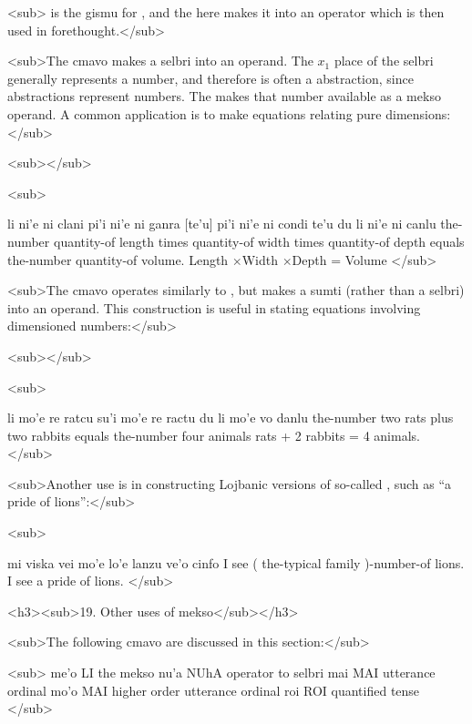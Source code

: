 <sub> is the gismu for ,
    and the  here makes it into an operator which is then
    used in forethought.</sub>

<sub>The cmavo  makes a selbri into an operand. The
    $x_1$ place of the selbri generally represents a number, and
    therefore is often a  abstraction, since 
    abstractions represent numbers. The  makes that number
    available as a mekso operand. A common application is to make
    equations relating pure dimensions:</sub>

<sub></sub>

<sub>
\begin{example}
li ni'e ni clani  pi'i\n
\T	ni'e ni ganra [te'u] pi'i\n
\T	ni'e ni condi te'u\n
\T	du li ni'e ni canlu\n
the-number quantity-of length times\n
\T	quantity-of width times\n
\T	quantity-of depth\n
\T	equals the-number quantity-of volume.\n
Length $\times$Width $\times$Depth = Volume
</sub>
\end{example}

<sub>The cmavo  operates similarly to , but
    makes a sumti (rather than a selbri) into an operand. This
    construction is useful in stating equations involving
    dimensioned numbers:</sub>

<sub></sub>

<sub>
\begin{example}
li mo'e re ratcu su'i mo'e re ractu\n
\T	du li mo'e vo danlu\n
the-number two rats plus two rabbits\n
\T	equals the-number four animals rats + 2 rabbits = 4 animals.
</sub>
\end{example}

<sub>Another use is in constructing Lojbanic versions of
    so-called , such as ``a pride of
    lions'':</sub>

<sub>
\begin{example}
mi viska vei mo'e lo'e lanzu ve'o cinfo\n
I see ( the-typical family )-number-of lions.\n
I see a pride of lions.
</sub>
\end{example}

<h3><sub>19. Other uses of mekso</sub></h3>

<sub>The following cmavo are discussed in this
    section:</sub>

<sub>   me'o    LI  the mekso
    nu'a    NUhA    operator to selbri
    mai MAI utterance ordinal
    mo'o    MAI higher order utterance ordinal
    roi ROI quantified tense
</sub>

